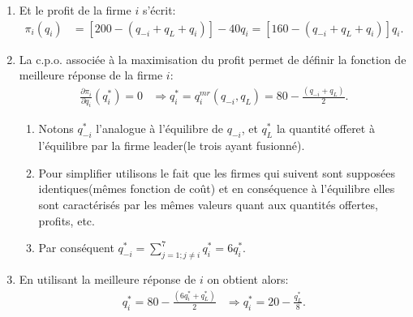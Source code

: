 \documentclass[notes, ignorenonframetext, compress, 10pt, xcolor=svgnames, aspectratio=169]{beamer}
\begin{document}
\begin{frame}[allowframebreaks]{\insertsection}
\begin{enumerate}[$\star$]
            \item Et le profit de la firme $i$ s'écrit:
            \begin{align*}
                \pi_i(q_i) &= \left[200 - (q_{-i} + q_L + q_i ) \right] - 40q_i = \left[160 - ( q_{-i} + q_L + q_i )\right]q_i.
            \end{align*}
            \item La c.p.o. associée à la maximisation du profit permet de définir la fonction
            de meilleure réponse de la firme $i$:
            \begin{align*}
             \frac{\partial \pi_i}{\partial q_i}(q_i^{*}) = 0 &\Rightarrow 
             q_i^{*} = q_i^{mr}(q_{-i}, q_L) = 80 - \frac{(q_{-i} + q_L)}{2}.
             \end{align*}
             \begin{enumerate}[$\star$]
                \item Notons $q_{-i}^{*}$ l'analogue à l'équilibre de $q_{-i}$, et $q_L^*$ la quantité offeret
               à l'équilibre par la firme leader(le trois ayant fusionné). 
               \item Pour simplifier utilisons le fait que les firmes qui suivent 
               sont supposées identiques(mêmes fonction de coût) et en conséquence 
               à l'équilibre elles sont caractérisés par les mêmes valeurs quant aux quantités offertes, profits, etc.  
               \item Par conséquent $q_{-i}^{*} = \sum_{j=1; j\neq i}^7 q_i^* = 6q_i^*$.
              \end{enumerate}
              \item En utilisant la meilleure réponse de $i$ on obtient alors:
              \begin{align*}
                  q_i^{*}= 80 - \frac{(6q_i^* + q_L^*)}{2} &\Rightarrow q_i^* = 20 -\frac{q_L^*}{8}.
                  \end{align*}


\end{enumerate}
\end{frame}
\end{document}
